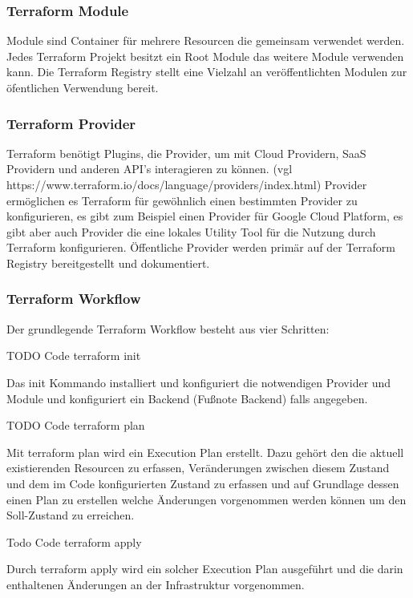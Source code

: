 \subsubsection{Terraform Module}

Module sind Container für mehrere Resourcen die gemeinsam verwendet werden.
Jedes Terraform Projekt besitzt ein Root Module das weitere Module verwenden
kann. Die Terraform Registry stellt eine Vielzahl an veröffentlichten
Modulen zur öfentlichen Verwendung bereit.

\subsubsection{Terraform Provider}

Terraform benötigt Plugins, die Provider, um mit Cloud Providern,
SaaS Providern und anderen API's interagieren zu können. (vgl https://www.terraform.io/docs/language/providers/index.html)
Provider ermöglichen es Terraform für gewöhnlich einen bestimmten Provider zu
konfigurieren, es gibt zum Beispiel einen Provider für Google Cloud
Platform, es gibt aber auch Provider die eine lokales Utility Tool für die
Nutzung durch Terraform konfigurieren. Öffentliche Provider werden primär
auf der Terraform Registry bereitgestellt und dokumentiert.

\subsubsection{Terraform Workflow}

Der grundlegende Terraform Workflow besteht aus vier Schritten:

TODO Code terraform init

Das init Kommando installiert und konfiguriert die notwendigen Provider
und Module und konfiguriert ein Backend (Fußnote Backend) falls angegeben.

TODO Code terraform plan

Mit terraform plan wird ein Execution Plan erstellt. Dazu gehört den die
aktuell existierenden Resourcen zu erfassen, Veränderungen zwischen
diesem Zustand und dem im Code konfigurierten Zustand zu erfassen und
auf Grundlage dessen einen Plan zu erstellen welche Änderungen vorgenommen
werden können um den Soll-Zustand zu erreichen.

Todo Code terraform apply

Durch terraform apply wird ein solcher Execution Plan ausgeführt und die darin
enthaltenen Änderungen an der Infrastruktur vorgenommen.

